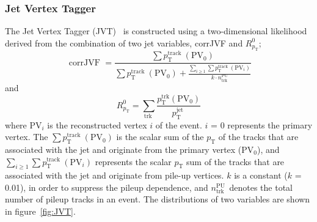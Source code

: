 \subsubsection{Jet Vertex Tagger}
The Jet Vertex Tagger (JVT)~\cite{PERF-2014-03} is constructed using a two-dimensional likelihood derived from the combination of two jet variables, corrJVF and $R^0_{p_\mathrm{T}}$;
\begin{equation}
\text { corrJVF }=\frac{\sum p_{\mathrm{T}}^{\text {track }}\left(\mathrm{PV}_0\right)}{\sum p_{\mathrm{T}}^{\text {track }}\left(\mathrm{PV}_0\right)+\frac{\sum_{i \geq 1} \sum p_{\mathrm{T}}^{\text {track }}\left(\mathrm{PV}_i\right)}{k \cdot n_{\mathrm{trk}}^{\mathrm{PU}}}}
\end{equation}
and
\begin{equation}
R_{p_{\mathrm{T}}}^0=\sum_{\text {trk }} \frac{p_{\mathrm{T}}^{\mathrm{trk}}\left(\mathrm{PV}_0\right)}{p_{\mathrm{T}}^{\text {jet }}}
\end{equation}
where PV$_i$ is the reconstructed vertex $i$ of the event. $i$ = 0 represents the primary vertex. The $\sum p_{\mathrm{T}}^{\text {track }}\left(\mathrm{PV}_0\right)$ is the scalar sum of the $p_\mathrm{T}$ of the tracks that are associated with the jet and originate from the primary vertex (PV$_0$), and $\sum_{i \geq 1} \sum p_{\mathrm{T}}^{\text {track }}\left(\mathrm{PV}_i\right)$ represents the scalar $p_\mathrm{T}$ sum of the tracks that are associated with the jet and originate from pile-up vertices. $k$ is a constant ($k$ = 0.01), in order to suppress the pileup dependence, and $n_{\text {trk }}^{\mathrm{PU}}$ denotes the total number of pileup tracks in an event. The distributions of two variables are shown in figure~\ref{fig:JVT}. 
